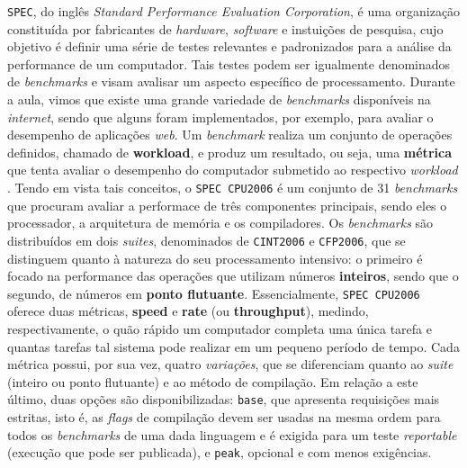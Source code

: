 \documentclass[12pt]{article}
\begin{document}
\texttt{SPEC}, do inglês \textit{Standard Performance Evaluation Corporation}, é
uma organização constituída por fabricantes de \textit{hardware},
\textit{software} e instuições de pesquisa, cujo objetivo é definir uma série de
testes relevantes e padronizados para a análise da performance de um computador.
Tais testes podem ser igualmente denominados de \textit{benchmarks} e visam
avalisar um aspecto específico de processamento. Durante a aula, vimos que
existe uma grande variedade de \textit{benchmarks} disponíveis na
\textit{internet}, sendo que alguns foram implementados, por exemplo, para
avaliar o desempenho de aplicações \textit{web}. Um \textit{benchmark} realiza
um conjunto de operações definidos, chamado de \textbf{workload}, e produz um
resultado, ou seja, uma \textbf{métrica} que tenta avaliar o desempenho do
computador submetido ao respectivo \textit{workload} \cite{SPEC:11}. Tendo em
vista tais conceitos, o \texttt{SPEC CPU2006} é um conjunto de 31 \textit{benchmarks} que
procuram avaliar a performace de três componentes principais, sendo eles o
processador, a arquitetura de memória e os compiladores. Os \textit{benchmarks}
são distribuídos em dois \textit{suites}, denominados de \texttt{CINT2006} e
\texttt{CFP2006}, que se distinguem quanto à natureza do seu processamento
intensivo: o primeiro é focado na performance das operações que utilizam números
\textbf{inteiros}, sendo que o segundo, de números em \textbf{ponto flutuante}.
Essencialmente, \texttt{SPEC CPU2006} oferece duas métricas, \textbf{speed} e
\textbf{rate} (ou \textbf{throughput}), medindo, respectivamente, o quão rápido
um computador completa uma única tarefa e quantas tarefas tal sistema pode
realizar em um pequeno período de tempo. Cada métrica possui, por sua vez,
quatro \textit{variações}, que se diferenciam quanto ao \textit{suite} (inteiro ou
ponto flutuante) e ao método de compilação. Em relação a este último, duas
opções são disponibilizadas: \texttt{base}, que apresenta requisições mais
estritas, isto é, as \textit{flags} de compilação devem ser usadas na mesma
ordem para todos os \textit{benchmarks} de uma dada linguagem e é exigida para
um teste \textit{reportable} (execução que pode ser publicada), e \texttt{peak}, opcional
e com menos exigências.
\end{document}
